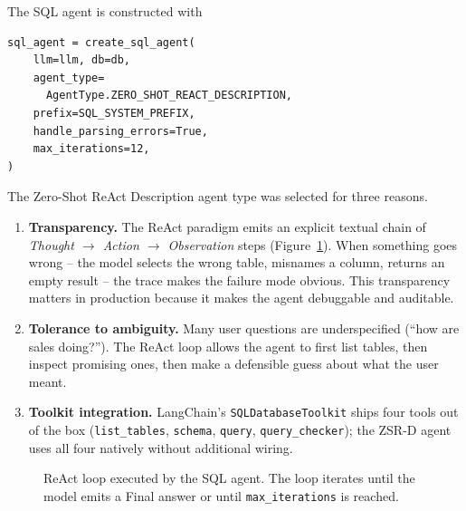 \documentclass[11pt,a4paper]{article}
\begin{document}
The SQL agent is constructed with
\begin{lstlisting}
sql_agent = create_sql_agent(
    llm=llm, db=db,
    agent_type=
      AgentType.ZERO_SHOT_REACT_DESCRIPTION,
    prefix=SQL_SYSTEM_PREFIX,
    handle_parsing_errors=True,
    max_iterations=12,
)
\end{lstlisting}

The Zero-Shot ReAct Description agent type was selected for three
reasons.
\begin{enumerate}
  \item \textbf{Transparency.} The ReAct paradigm \cite{yao2022react}
        emits an explicit textual chain of
        \emph{Thought $\rightarrow$ Action $\rightarrow$ Observation}
        steps (Figure~\ref{fig:react}). When something goes wrong --
        the model selects the wrong table, misnames a column, returns
        an empty result -- the trace makes the failure mode obvious.
        This transparency matters in production because it makes the
        agent debuggable and auditable.
  \item \textbf{Tolerance to ambiguity.} Many user questions are
        underspecified (``how are sales doing?''). The ReAct loop
        allows the agent to first list tables, then inspect promising
        ones, then make a defensible guess about what the user meant.
  \item \textbf{Toolkit integration.} LangChain's
        \texttt{SQLDatabaseToolkit} ships four tools out of the box
        (\texttt{list\_tables}, \texttt{schema}, \texttt{query},
        \texttt{query\_checker}); the ZSR-D agent uses all four
        natively without additional wiring.
\end{enumerate}

\begin{figure}[h]
\centering
{}
\caption{ReAct loop executed by the SQL agent. The loop iterates until
the model emits a Final answer or until \texttt{max\_iterations} is
reached.}
\label{fig:react}
\end{figure}
\end{document}
